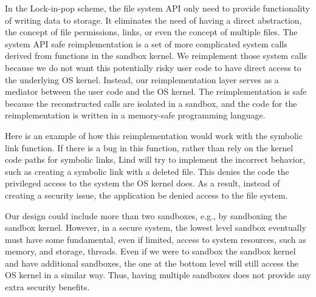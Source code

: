 In the Lock-in-pop scheme, the file system API only need
to provide functionality of writing data to storage. 
It eliminates the need of having a direct abstraction, the
concept of file permissions, links, or even the concept of multiple files.
The system API safe reimplementation is a set of more complicated system calls
derived from functions in the sandbox kernel.
We reimplement those system calls because we do not want this potentially risky user code
to have direct access to the underlying OS kernel.
Instead, our reimplementation layer serves as a mediator between the user code
and the OS kernel. The reimplementation is safe
because the reconstructed calls are isolated in a sandbox, and the code for the
reimplementation is written in a memory-safe programming language.

Here is an example of how this reimplementation would work with the symbolic link function.
If there is a bug in this function, rather than rely on the kernel code paths
for symbolic links, Lind will try to implement the incorrect behavior, such as creating a symbolic link 
with a deleted file. 
This denies the code the privileged access to the system the OS kernel does.
As a result, instead of creating a security issue, the application be denied access
to the file system.

Our design could include more than two sandboxes, e.g., by sandboxing the sandbox
kernel. However, in a secure system,
the lowest level sandbox eventually must have some fundamental,
even if limited, access to system resources, such as memory, and storage, threads.
Even if we were to sandbox the sandbox kernel and have additional sandboxes,
the one at the bottom level will still access the OS kernel in a similar way.
Thus, having multiple sandboxes does not provide any extra security benefits.

%

%

%

